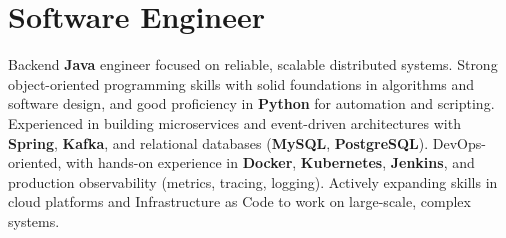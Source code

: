 \section{Software Engineer}
\small{
Backend \textbf{Java} engineer focused on reliable, scalable distributed systems. Strong object-oriented programming skills with solid foundations in algorithms and software design, and good proficiency in \textbf{Python} for automation and scripting. Experienced in building microservices and event-driven architectures with \textbf{Spring}, \textbf{Kafka}, and relational databases (\textbf{MySQL}, \textbf{PostgreSQL}). DevOps-oriented, with hands-on experience in \textbf{Docker}, \textbf{Kubernetes}, \textbf{Jenkins}, and production observability (metrics, tracing, logging). Actively expanding skills in cloud platforms and Infrastructure as Code to work on large-scale, complex systems.
}